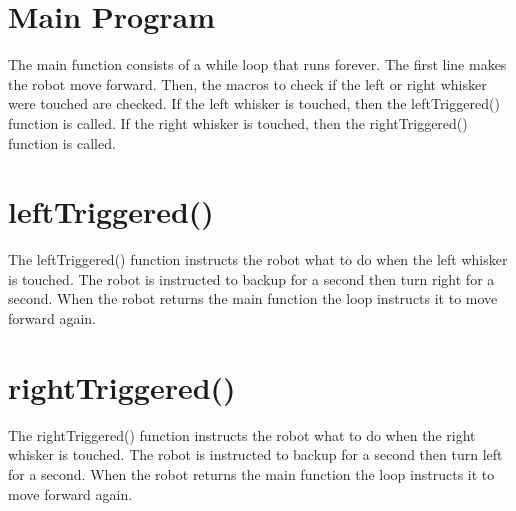 \documentclass[12pt,letterpaper]{article}
\begin{document}
\section{Main Program}
The main function consists of a while loop that runs forever.
The first line makes the robot move forward.
Then, the macros to check if the left or right whisker were touched are checked.
If the left whisker is touched, then the leftTriggered() function is called.
If the right whisker is touched, then the rightTriggered() function is called.



\section{leftTriggered()}
The leftTriggered() function instructs the robot what to do when the left whisker is touched.
The robot is instructed to backup for a second then turn right for a second.
When the robot returns the main function the loop instructs it to move forward again.

\section{rightTriggered()}
The rightTriggered() function instructs the robot what to do when the right whisker is touched.
The robot is instructed to backup for a second then turn left for a second.
When the robot returns the main function the loop instructs it to move forward again.
\end{document}
